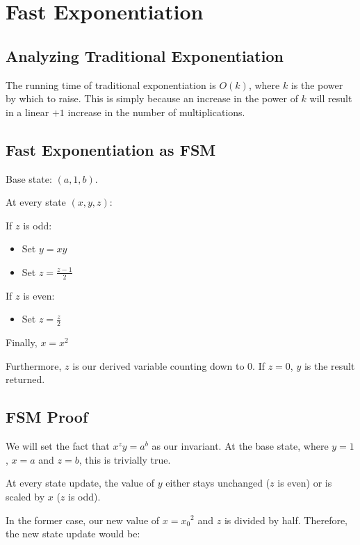 \documentclass[letterpaper]{article}
\begin{document}
\section{Fast Exponentiation}
\label{sec:org14712e7}

\subsection{Analyzing Traditional Exponentiation}
\label{sec:orgdf13aa6}
The running time of traditional exponentiation is \(O(k)\), where \(k\) is the power by which to raise. This is simply because an increase in the power of \(k\) will result in a linear \(+1\) increase in the number of multiplications.

\subsection{Fast Exponentiation as FSM}
\label{sec:org512be2d}
Base state: \((a,1,b)\).

At every state \((x,y,z)\):

If \(z\) is odd:

\begin{itemize}
\item Set \(y=xy\)
\item Set \(z=\frac{z-1}{2}\)
\end{itemize}

If \(z\) is even:

\begin{itemize}
\item Set \(z= \frac{z}{2}\)
\end{itemize}

Finally, \(x = x^2\)

Furthermore, \(z\) is our derived variable counting down to \(0\). If \(z=0\), \(y\) is the result returned. 

\subsection{FSM Proof}
\label{sec:org2c37244}
We will set the fact that \(x^zy = a^b\) as our invariant. At the base state, where \(y=1\), \(x=a\) and \(z=b\), this is trivially true.

At every state update, the value of \(y\) either stays unchanged (\(z\) is even) or is scaled by \(x\) (\(z\) is odd).

In the former case, our new value of \(x={x_0}^2\) and \(z\) is divided by half. Therefore, the new state update would be:
\end{document}
